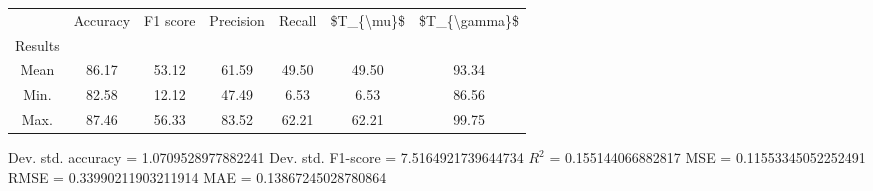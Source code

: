 \begin{tabular}{|c|c|c|c|c|c|c|}
\toprule
{} &  Accuracy &  F1 score &  Precision &  Recall &  \$T\_\{\textbackslash mu\}\$ &  \$T\_\{\textbackslash gamma\}\$ \\
Results &           &           &            &         &            &               \\
\hline
Mean    &     86.17 &     53.12 &      61.59 &   49.50 &      49.50 &         93.34 \\
Min.    &     82.58 &     12.12 &      47.49 &    6.53 &       6.53 &         86.56 \\
Max.    &     87.46 &     56.33 &      83.52 &   62.21 &      62.21 &         99.75 \\
\bottomrule
\end{tabular}

 Dev. std. accuracy = 1.0709528977882241
 Dev. std. F1-score = 7.5164921739644734
 $R^2$ = 0.155144066882817
 MSE = 0.11553345052252491
 RMSE = 0.33990211903211914
 MAE = 0.13867245028780864